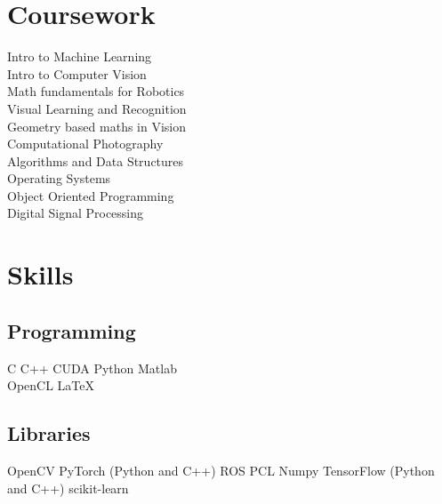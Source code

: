 \documentclass[]{deedy-resume-openfont}
\begin{document}
\begin{minipage}[t]{0.3\textwidth}

\section{Coursework}


Intro to Machine Learning \\
Intro to Computer Vision \\
Math fundamentals for Robotics \\
Visual Learning and Recognition \\
Geometry based maths in Vision \\
Computational Photography \\

\sectionsep
Algorithms and Data Structures \\
Operating Systems \\
Object Oriented Programming \\
Digital Signal Processing \\


\section{Skills}
\subsection{Programming}
C \textbullet{}   C++ \textbullet{} CUDA \textbullet{} Python \textbullet{} Matlab \\
\textbullet{} OpenCL \textbullet{} \LaTeX\ \\
\sectionsep
\subsection{Libraries}
OpenCV \textbullet{} PyTorch (Python and C++) \textbullet{} ROS \textbullet{} PCL \textbullet{} Numpy \textbullet{} TensorFlow (Python and C++)
\textbullet{} scikit-learn \\
\sectionsep

\end{minipage}
\end{document}
